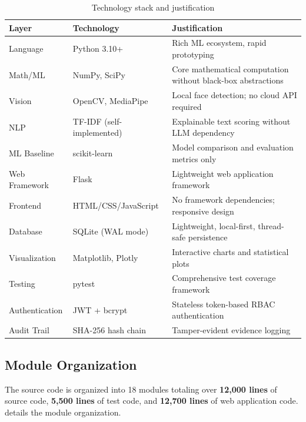 \documentclass{article}
\begin{document}
\begin{table}[H]
\centering
\caption{Technology stack and justification}
\label{tab:tech_stack}
\begin{tabular}{l l p{7cm}}
\toprule
\textbf{Layer} & \textbf{Technology} & \textbf{Justification} \\
\midrule
Language & Python 3.10+ & Rich ML ecosystem, rapid prototyping \\
Math/ML & NumPy, SciPy & Core mathematical computation without black-box abstractions \\
Vision & OpenCV, MediaPipe & Local face detection; no cloud API required \cite{mediapipe_face, opencv_library} \\
NLP & TF-IDF (self-implemented) & Explainable text scoring without LLM dependency \cite{tfidf_original} \\
ML Baseline & scikit-learn & Model comparison and evaluation metrics only \\
Web Framework & Flask & Lightweight web application framework \cite{flask_web} \\
Frontend & HTML/CSS/JavaScript & No framework dependencies; responsive design \\
Database & SQLite (WAL mode) & Lightweight, local-first, thread-safe persistence \\
Visualization & Matplotlib, Plotly & Interactive charts and statistical plots \\
Testing & pytest & Comprehensive test coverage framework \\
Authentication & JWT + bcrypt & Stateless token-based RBAC authentication \\
Audit Trail & SHA-256 hash chain & Tamper-evident evidence logging \\
\bottomrule
\end{tabular}
\end{table}

\subsection{Module Organization}

The source code is organized into 18 modules totaling over \textbf{12,000 lines} of source code, \textbf{5,500 lines} of test code, and \textbf{12,700 lines} of web application code.  details the module organization.
\end{document}
